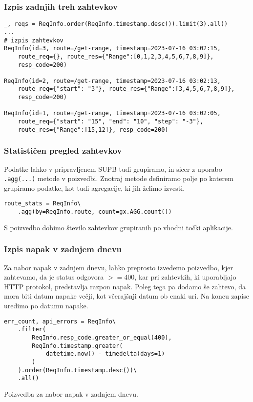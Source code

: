 \documentclass[a4paper,12pt,openright]{book}
\begin{document}
    \subsubsection{Izpis zadnjih treh zahtevkov}

\begin{verbatim}
_, reqs = ReqInfo.order(ReqInfo.timestamp.desc()).limit(3).all()
... 
# izpis zahtevkov
ReqInfo(id=3, route=/get-range, timestamp=2023-07-16 03:02:15, 
    route_req={}, route_res={"Range":[0,1,2,3,4,5,6,7,8,9]},
    resp_code=200)
    
ReqInfo(id=2, route=/get-range, timestamp=2023-07-16 03:02:13, 
    route_req={"start": "3"}, route_res={"Range":[3,4,5,6,7,8,9]},
    resp_code=200)
    
ReqInfo(id=1, route=/get-range, timestamp=2023-07-16 03:02:05,
    route_req={"start": "15", "end": "10", "step": "-3"},
    route_res={"Range":[15,12]}, resp_code=200)
\end{verbatim}

    \newpage
    \subsubsection{Statističen pregled zahtevkov}

    Podatke lahko v pripravljenem SUPB tudi grupiramo, in sicer z uporabo {\tt .agg(...)} metode v poizvedbi. Znotraj metode definiramo polje po katerem grupiramo podatke, kot tudi agregacije, ki jih želimo izvesti.
    
\begin{verbatim}
route_stats = ReqInfo\
    .agg(by=ReqInfo.route, count=gx.AGG.count())
\end{verbatim}

    \noindent
    S poizvedbo dobimo število zahtevkov grupiranih po vhodni točki aplikacije. 

    \subsubsection{Izpis napak v zadnjem dnevu}

    Za nabor napak v zadnjem dnevu, lahko preprosto izvedemo poizvedbo, kjer zahtevamo, da je status odgovora $>= 400$, kar pri zahtevkih, ki uporabljajo HTTP protokol, predstavlja razpon napak. Poleg tega pa dodamo še zahtevo, da mora biti datum napake večji, kot včerajšnji datum ob enaki uri. Na koncu zapise uredimo po datumu napake.

\begin{code}
\begin{verbatim}
err_count, api_errors = ReqInfo\
    .filter(
        ReqInfo.resp_code.greater_or_equal(400),
        ReqInfo.timestamp.greater(
            datetime.now() - timedelta(days=1)
        )
    ).order(ReqInfo.timestamp.desc())\
    .all()
\end{verbatim}
\caption{Poizvedba za nabor napak v zadnjem dnevu.}
\label{api_errors_code}
\end{code}
\end{document}
